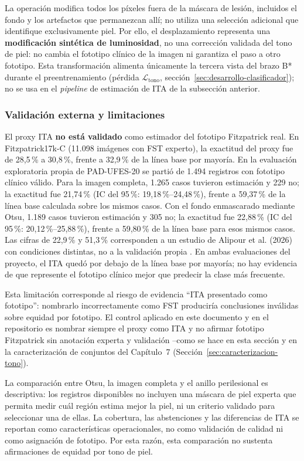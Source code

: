 La operación modifica todos los píxeles fuera de la máscara de lesión, incluidos el fondo y los artefactos que permanezcan allí; no utiliza una selección adicional que identifique exclusivamente piel. Por ello, el desplazamiento representa una \textbf{modificación sintética de luminosidad}, no una corrección validada del tono de piel: no cambia el fototipo clínico de la imagen ni garantiza el paso a otro fototipo. Esta transformación alimenta únicamente la tercera vista del brazo B* durante el preentrenamiento (pérdida $\mathcal L_{\mathrm{tono}}$, sección~\ref{sec:desarrollo-clasificador}); no se usa en el \textit{pipeline} de estimación de ITA de la subsección anterior.

\subsubsection{Validación externa y limitaciones}

El proxy ITA \textbf{no está validado} como estimador del fototipo Fitzpatrick real. En Fitzpatrick17k-C (11.098 imágenes con FST experto), la exactitud del proxy fue de 28,5\,\% a 30,8\,\%, frente a 32,9\,\% de la línea base por mayoría. En la evaluación exploratoria propia de PAD-UFES-20 se partió de 1.494 registros con fototipo clínico válido. Para la imagen completa, 1.265 casos tuvieron estimación y 229 no; la exactitud fue 21,74\,\% (IC del 95\,\%: 19,18\,\%--24,48\,\%), frente a 59,37\,\% de la línea base calculada sobre los mismos casos. Con el fondo enmascarado mediante Otsu, 1.189 casos tuvieron estimación y 305 no; la exactitud fue 22,88\,\% (IC del 95\,\%: 20,12\,\%--25,88\,\%), frente a 59,80\,\% de la línea base para esos mismos casos. Las cifras de 22,9\,\% y 51,3\,\% corresponden a un estudio de Alipour et al. (2026) con condiciones distintas, no a la validación propia \parencite{alipour2026italimitations}. En ambas evaluaciones del proyecto, el ITA quedó por debajo de la línea base por mayoría; no hay evidencia de que represente el fototipo clínico mejor que predecir la clase más frecuente.

Esta limitación corresponde al riesgo de evidencia \enquote{ITA presentado como fototipo}: nombrarlo incorrectamente como FST produciría conclusiones inválidas sobre equidad por fototipo. El control aplicado en este documento y en el repositorio es nombrar siempre el proxy como ITA y no afirmar fototipo Fitzpatrick sin anotación experta y validación --como se hace en esta sección y en la caracterización de conjuntos del Capítulo~7 (Sección~\ref{sec:caracterizacion-tono}).

La comparación entre Otsu, la imagen completa y el anillo perilesional es descriptiva: los registros disponibles no incluyen una máscara de piel experta que permita medir cuál región estima mejor la piel, ni un criterio validado para seleccionar una de ellas. La cobertura, las abstenciones y las diferencias de ITA se reportan como características operacionales, no como validación de calidad ni como asignación de fototipo. Por esta razón, esta comparación no sustenta afirmaciones de equidad por tono de piel.

